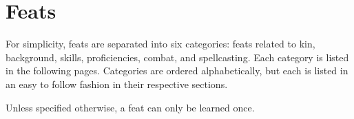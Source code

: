 \section{Feats}
For simplicity, feats are separated into six categories: feats related to kin, background, skills, proficiencies, combat, and spellcasting.
Each category is listed in the following pages.
Categories are ordered alphabetically, but each is listed in an easy to follow fashion in their respective sections.

Unless specified otherwise, a feat can only be learned once.







